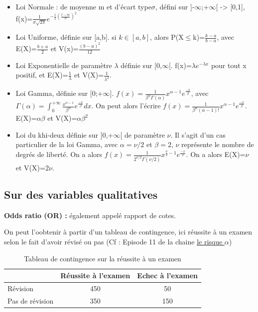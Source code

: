 \documentclass[
]{article}
\providecommand{\tightlist}{%
  \setlength{\itemsep}{0pt}\setlength{\parskip}{0pt}}
\begin{document}
\begin{itemize}
\tightlist
\item
  Loi Normale : de moyenne m et d'écart type\(\sigma\), défini sur
  {]}-\(\infty\);+\(\infty\){[} -\textgreater{} {[}0,1{]},
  f(x)=\(\frac{1}{\sigma\sqrt{2\pi}}e^{-\frac{1}{2}(\frac{t-m}{\sigma})^2}\)
\item
  Loi Uniforme, définie sur {[}a,b{]}. si \(k \in [a,b]\), alors
  P(X\(\leq\)k)=\(\frac{k-a}{b-a}\), avec E(X)=\(\frac{b+a}{2}\) et
  V(x)=\(\frac{(b-a)^2}{12}\)
\item
  Loi Exponentielle de paramètre \(\lambda\) définie sur
  {[}0,\(\infty\){[}. f(x)=\(\lambda e^{-\lambda x}\) pour tout x
  positif, et E(X)=\(\frac{1}{\lambda}\) et
  V(X)=\(\frac{1}{\lambda^2}\).
\item
  Loi Gamma, définie sur {[}0;\(+\infty\){]}.
  \(f(x)=\frac{1}{\beta ^\alpha \Gamma (\alpha )}x^{\alpha -1}e^{\frac{-x}{\beta}}\),
  avec
  \(\Gamma(\alpha)=\int_0^{+\infty}\frac{x^{\alpha-1}}{\beta^\alpha}e^{\frac{-x}{\beta}}dx\).
  On peut alors l'écrire
  \(f(x)=\frac{1}{\beta^\alpha(\alpha-1)!}x^{\alpha-1}e^{\frac{-x}{\beta}}\).
  E(X)=\(\alpha\beta\) et V(X)=\(\alpha\beta^2\)
\item
  Loi du khi-deux définie sur {]}0,+\(\infty\){[} de paramètre \(\nu\).
  Il s'agit d'un cas particulier de la loi Gamma, avec
  \(\alpha = \nu/2\) et \(\beta=2\), \(\nu\) représente le nombre de
  degrés de liberté. On a alors
  \(f(x)=\frac{1}{2^{\nu/2}\Gamma(\nu/2)}x^{\frac{\nu}{2}-1}e^{\frac{-x}{2}}\).
  On a alors E(X)=\(\nu\) et V(X)=\(2\nu\).
\end{itemize}

\hypertarget{sur-des-variables-qualitatives}{%
\subsection{Sur des variables
qualitatives}\label{sur-des-variables-qualitatives}}

\textbf{Odds ratio (OR) :} également appelé rapport de cotes.

On peut l'oobtenir à partir d'un tableau de contingence, ici réussite à
un examen selon le fait d'avoir révisé ou pas (Cf : Episode 11 de la
chaine
\href{https://www.youtube.com/watch?v=eB1FMSCD5zc&t=28s}{le risque $\alpha$})

\begin{table}[!h]
  \centering
  \begin{tabular}{l|cc}
  & Réussite à l'examen & Echec à l'examen \\
  \hline
  Révision & 450 &50 \\
  Pas de révision & 350 & 150 \\
  \end{tabular}
  \caption{Tableau de contingence sur la réussite à un examen}
\end{table}
\end{document}
